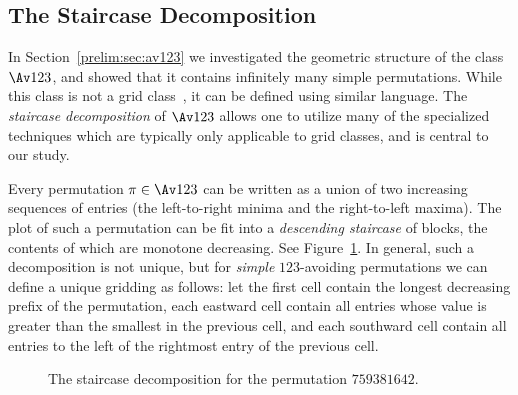 \documentclass[12pt,twoside]{memoir}
\begin{document}
    \subsection{The Staircase Decomposition}
      
      In Section~\ref{prelim:sec:av123} we investigated the geometric
      structure of the class $\Av 123$, and showed that it contains infinitely
      many simple permutations. While this class is not a grid
      class~\cite{GridClasses}, it can be defined using similar language. The
      \emph{staircase decomposition} of $\Av 123$ allows one to utilize many of
      the specialized techniques which are typically only applicable to grid
      classes, and is central to our study.  

      Every permutation $\pi \in \Av 123$ can be written as a union of two
      increasing sequences of entries (the left-to-right minima and the
      right-to-left maxima). The plot of such a permutation can be fit into a
      \emph{descending staircase} of blocks, the contents of which are monotone
      decreasing. See Figure~\ref{involutions:fig:staircase}. In general, such a
      decomposition is not unique, but for \emph{simple} $123$-avoiding
      permutations we can define a unique gridding as follows: let the first cell
      contain the longest decreasing prefix of the permutation, each eastward
      cell contain all entries whose value is greater than the smallest in the
      previous cell, and each southward cell contain all entries to the left of
      the rightmost entry of the previous cell. 
    
      \begin{figure}[t] \centering
      \caption{The staircase decomposition for the permutation $759381642$.}
      \label{involutions:fig:staircase}
      \end{figure}
\end{document}
